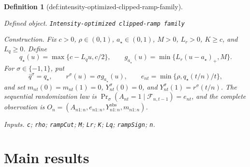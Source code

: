\documentclass{article}
\newtheorem{definition}{Definition}
\begin{document}
\begin{definition}[def:intensity-optimized-clipped-ramp-family]\label{def:intensity-optimized-clipped-ramp-family}
\par\smallskip\noindent\emph{Defined object.} \texttt{Intensity-\allowbreak{}optimized clipped-\allowbreak{}ramp family}
\par\smallskip\noindent\emph{Construction.} Fix \(c>0\), \(\rho\in(0,1)\), \(a_\star\in(0,1)\), \(M>0\), \(L_r>0\), \(K\ge c\), and \(L_q\ge0\). Define
\[
 q_\star(u)=\max\{c-L_qu,c/2\},\qquad
 g_{a_\star}(u)=\min\{L_r(u-a_\star)_+,M\}.
\]
For \(\sigma\in\{-1,1\}\), put
\[
 \bar q^\sigma=q_\star,\qquad r^\sigma(u)=\sigma g_{a_\star}(u),\qquad
 e_{nt}=\min\{\rho,q_\star(t/n)/t\},
\]
and set \(m_{nt}(0)=m_{nt}(1)=0\), \(Y_{nt}^\sigma(0)=0\), and \(Y_{nt}^\sigma(1)=r^\sigma(t/n)\). The sequential randomization law is
\(\Pr_\sigma(A_{nt}=1\mid\mathcal F_{n,t-1})=e_{nt}\), and the complete observation is \(O_n=(A_{n1:n},e_{n1:n},Y_{n1:n}^{\mathrm{obs}},m_{n1:n})\).
\par\smallskip\noindent\emph{Inputs.} \texttt{c}; \texttt{rho}; \texttt{rampCut}; \texttt{M}; \texttt{Lr}; \texttt{K}; \texttt{Lq}; \texttt{rampSign}; \texttt{n}.
\end{definition}

\section{Main results}
\end{document}
